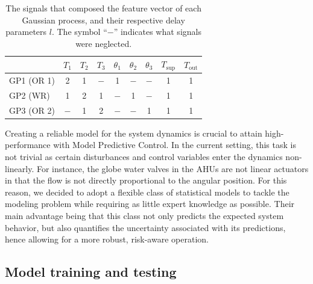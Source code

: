 \begin{table}[!t]
	\small
	\centering
	\begin{tabular}{l|c|c|c|c|c|c|c|c}
		\hline & $T_\text{1}$ & $T_\text{2}$ & $T_\text{3}$ & $\theta_\text{1}$ & $\theta_\text{2}$ & $\theta_\text{3}$ & $T_\text{sup}$ & $T_\text{out}$ \\\hline
		GP1 (OR 1) & 2 & 1 & $-$ & 1 & $-$ & $-$ & 1 & 1 \\
		GP2 (WR) & 1 & 2 & 1 & $-$ & 1 & $-$ & 1 & 1 \\
		GP3 (OR 2) & $-$ & 1 & 2 & $-$ & $-$ & 1 & 1 & 1 \\
		\hline
	\end{tabular}
	\caption{The signals that composed the feature vector of each Gaussian process, and their respective delay parameters $l$. The symbol ``$-$'' indicates what signals were neglected.}
	\label{tab.features}
\end{table}

Creating a reliable model for the system dynamics is crucial to attain high-performance with Model Predictive Control. In the current setting, this task is not trivial as certain disturbances and control variables enter the dynamics non-linearly. For instance, the globe water valves in the AHUs are not linear actuators in that the flow is not directly proportional to the angular position. For this reason, we decided to adopt a flexible class of statistical models to tackle the modeling problem while requiring as little expert knowledge as possible. Their main advantage being that this class not only predicts the expected system behavior, but also quantifies the uncertainty associated with its predictions, hence allowing for a more robust, risk-aware operation.

\subsection{Model training and testing}
\label{sec.ModelTrainingAndTesting}

